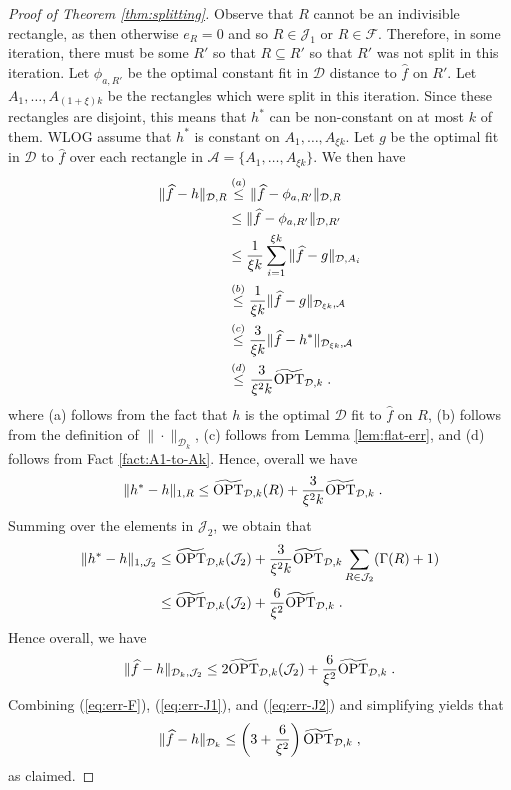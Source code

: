 \documentclass[final,12pt]{colt2018} %
\newcommand{\hier}{\mathcal{D}}
\newcommand{\calF}{\mathcal{F}}
\newcommand{\calJ}{\mathcal{J}}
\newcommand{\fhat}{\widehat{f}}
\newcommand{\tOPT}{\widetilde{\OPT}}
\begin{document}
\begin{proof}[Proof of Theorem \ref{thm:splitting}]
Observe that $R$ cannot be an indivisible rectangle, as then otherwise $e_R = 0$ and so $R \in \calJ_1$ or $R \in \calF$.
Therefore, in some iteration, there must be some $R'$ so that $R \subseteq R'$ so that $R'$ was not split in this iteration.
Let $\phi_{a, R'}$ be the optimal constant fit in $\hier$ distance to $\fhat$ on $R'$.
Let $A_1, \ldots, A_{(1 + \xi) k}$ be the rectangles which were split in this iteration.
Since these rectangles are disjoint, this means that $h^*$ can be non-constant on at most $k$ of them.
WLOG assume that $h^*$ is constant on $A_1, \ldots, A_{\xi k}$.
Let $g$ be the optimal fit in $\hier$ to $\fhat$ over each rectangle in $\mathcal{A} = \{ A_1, \ldots, A_{\xi k} \}$.
We then have
\begin{align*}
\| \fhat - h \|_{\hier, R} &\stackrel{(a)}{\leq} \| \fhat - \phi_{a, R'} \|_{\hier, R} \\
&\leq \| \fhat - \phi_{a, R'} \|_{\hier, R'} \\
&\leq \frac{1}{\xi k} \sum_{i = 1}^{\xi k} \| \fhat - g \|_{\hier, A_i} \\
&\stackrel{(b)}{\leq} \frac{1}{\xi k} \| \fhat - g \|_{\hier_{\xi k}, \mathcal{A}} \\
&\stackrel{(c)}{\leq} \frac{3}{\xi k} \| \fhat - h^* \|_{\hier_{\xi k}, \mathcal{A}} \\
&\stackrel{(d)}{\leq} \frac{3}{\xi^2 k} \tOPT_{\hier, k} \; .
\end{align*}
where (a) follows from the fact that $h$ is the optimal $\hier$ fit to $\fhat$ on $R$, (b) follows from the definition of $\| \cdot \|_{\hier_k}$, (c) follows from Lemma \ref{lem:flat-err}, and (d) follows from Fact \ref{fact:A1-to-Ak}.
Hence, overall we have 
\begin{align*}
\| h^* - h \|_{1, R} &\leq \tOPT_{\hier, k} (R) +  \frac{3}{\xi^2 k} \tOPT_{\hier, k} \; .
\end{align*}
Summing over the elements in $\calJ_2$, we obtain that 
\begin{align*}
\| h^* - h \|_{1, \calJ_2} &\leq \tOPT_{\hier, k} (\calJ_2) + \frac{3}{\xi^2 k} \tOPT_{\hier, k}  \sum_{R \in \calJ_2} (\Gamma (R) + 1) \\
&\leq \tOPT_{\hier, k} (\calJ_2) + \frac{6}{\xi^2} \tOPT_{\hier, k} \; .
\end{align*}
Hence overall, we have 
\begin{equation}
\label{eq:err-J2}
\| \fhat - h \|_{\hier_k, \calJ_2} \leq 2 \tOPT_{\hier, k} (\calJ_2) + \frac{6}{\xi^2} \tOPT_{\hier, k} \; .
\end{equation}
Combining (\ref{eq:err-F}), (\ref{eq:err-J1}), and (\ref{eq:err-J2}) and simplifying yields that
\[
\| \fhat - h \|_{\hier_k} \leq \left( 3 + \frac{6}{\xi^2} \right) \tOPT_{\hier, k}  \; ,
\]
as claimed.
\end{proof}
\end{document}
